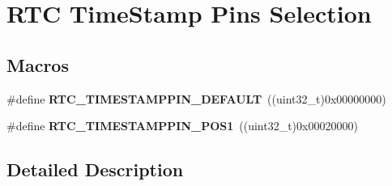\hypertarget{group___r_t_c_ex___time_stamp___pin___selection}{}\section{R\+TC Time\+Stamp Pins Selection}
\label{group___r_t_c_ex___time_stamp___pin___selection}
\subsection*{Macros}
\begin{DoxyCompactItemize}
\item 
\#define {\bfseries R\+T\+C\+\_\+\+T\+I\+M\+E\+S\+T\+A\+M\+P\+P\+I\+N\+\_\+\+D\+E\+F\+A\+U\+LT}~((uint32\+\_\+t)0x00000000)\hypertarget{group___r_t_c_ex___time_stamp___pin___selection_ga8ce8bdb904f1fef05ae3b59d6f59843a}{}\label{group___r_t_c_ex___time_stamp___pin___selection_ga8ce8bdb904f1fef05ae3b59d6f59843a}

\item 
\#define {\bfseries R\+T\+C\+\_\+\+T\+I\+M\+E\+S\+T\+A\+M\+P\+P\+I\+N\+\_\+\+P\+O\+S1}~((uint32\+\_\+t)0x00020000)\hypertarget{group___r_t_c_ex___time_stamp___pin___selection_ga66d2ca25220afef83ee3aa802216b609}{}\label{group___r_t_c_ex___time_stamp___pin___selection_ga66d2ca25220afef83ee3aa802216b609}

\end{DoxyCompactItemize}


\subsection{Detailed Description}
